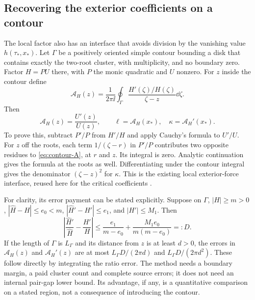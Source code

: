 \subsection{Recovering the exterior coefficients on a contour}
The local factor also has an interface that avoids division by the
vanishing value \(h(\tau_*,x_*)\). Let \(\Gamma\) be a positively
oriented simple contour bounding a disk that contains exactly the
two-root cluster, with multiplicity, and no boundary zero. Factor
\(H=P U\) there, with \(P\) the monic quadratic and \(U\) nonzero.
For \(z\) inside the contour define
\begin{equation}\label{eq:contour-A}
 \mathcal A_H(z)=\frac{1}{2\pi\ii}\oint_\Gamma
       \frac{H'(\zeta)/H(\zeta)}{\zeta-z}\dd\zeta.
\end{equation}
Then
\begin{equation}\label{eq:contour-exterior}
 \mathcal A_H(z)=\frac{U'(z)}{U(z)},\qquad
 \ell=\mathcal A_H(x_*),\quad \kappa=\mathcal A_H'(x_*).
\end{equation}
To prove this, subtract \(P'/P\) from \(H'/H\) and apply
Cauchy's formula to \(U'/U\). For \(z\) off the roots, each
term \(1/(\zeta-r)\) in \(P'/P\) contributes two opposite
residues to \eqref{eq:contour-A}, at \(r\) and \(z\).
Its integral is zero. Analytic continuation gives the formula at
the roots as well. Differentiating under the contour integral
gives the denominator \((\zeta-z)^2\) for \(\kappa\).
This is the existing local exterior-force interface, reused here
for the critical coefficients \cite{RTLocalTransfer}.

For clarity, its error payment can be stated explicitly. Suppose
on \(\Gamma\), \(|H|\ge m>0\),
\(|\widehat H-H|\le e_0<m\), \(|\widehat H'-H'|\le e_1\),
and \(|H'|\le M_1\). Then
\[
 \left|\frac{\widehat H'}{\widehat H}-\frac{H'}H\right|
 \le \frac{e_1}{m-e_0}+\frac{M_1e_0}{m(m-e_0)}=:D.
\]
If the length of \(\Gamma\) is \(L_\Gamma\) and its distance
from \(z\) is at least \(d>0\), the errors in \(\mathcal A_H(z)\)
and \(\mathcal A_H'(z)\) are at most
\(L_\Gamma D/(2\pi d)\) and \(L_\Gamma D/(2\pi d^2)\).
These follow directly by integrating the ratio error. The method
needs a boundary margin, a paid cluster count and complete source
errors; it does not need an internal pair-gap lower bound.
Its advantage, if any, is a quantitative comparison on a stated
region, not a consequence of introducing the contour.
